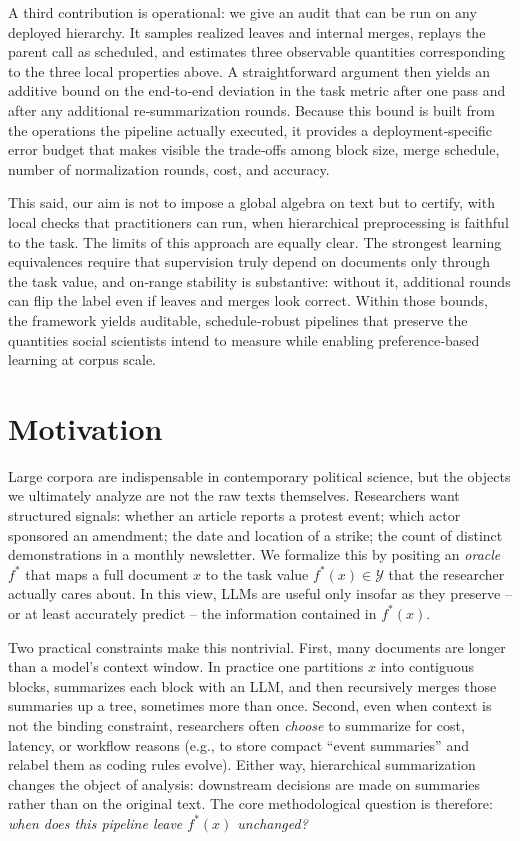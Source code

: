\documentclass[11pt]{article}
\newcommand{\Y}{\mathcal{Y}}               %
\newcommand{\fstar}{f^*}               %
\begin{document}
A third contribution is operational: we give an audit that can be run on any deployed hierarchy. It samples realized leaves and internal merges, replays the parent call as scheduled, and estimates three observable quantities corresponding to the three local properties above. A straightforward argument then yields an additive bound on the end‑to‑end deviation in the task metric after one pass and after any additional re‑summarization rounds. Because this bound is built from the operations the pipeline actually executed, it provides a deployment‑specific error budget that makes visible the trade‑offs among block size, merge schedule, number of normalization rounds, cost, and accuracy.

This said, our aim is not to impose a global algebra on text but to certify, with local checks that practitioners can run, when hierarchical preprocessing is faithful to the task. The limits of this approach are equally clear. The strongest learning equivalences require that supervision truly depend on documents only through the task value, and on‑range stability is substantive: without it, additional rounds can flip the label even if leaves and merges look correct. Within those bounds, the framework yields auditable, schedule‑robust pipelines that preserve the quantities social scientists intend to measure while enabling preference‑based learning at corpus scale.



\section{Motivation}\label{sec:motivation}

Large corpora are indispensable in contemporary political science, but the objects we ultimately analyze are not the raw texts themselves. Researchers want structured signals: whether an article reports a protest event; which actor sponsored an amendment; the date and location of a strike; the count of distinct demonstrations in a monthly newsletter. We formalize this by positing an \emph{oracle} $\fstar$ that maps a full document $x$ to the task value $\fstar(x)\in\Y$ that the researcher actually cares about. In this view, LLMs are useful only insofar as they preserve -- or at least accurately predict -- the information contained in $\fstar(x)$.

Two practical constraints make this nontrivial. First, many documents are longer than a model's context window. In practice one partitions $x$ into contiguous blocks, summarizes each block with an LLM, and then recursively merges those summaries up a tree, sometimes more than once. Second, even when context is not the binding constraint, researchers often \emph{choose} to summarize for cost, latency, or workflow reasons (e.g., to store compact ``event summaries'' and relabel them as coding rules evolve). Either way, hierarchical summarization changes the object of analysis: downstream decisions are made on summaries rather than on the original text. The core methodological question is therefore: \emph{when does this pipeline leave $\fstar(x)$ unchanged?}
\end{document}
